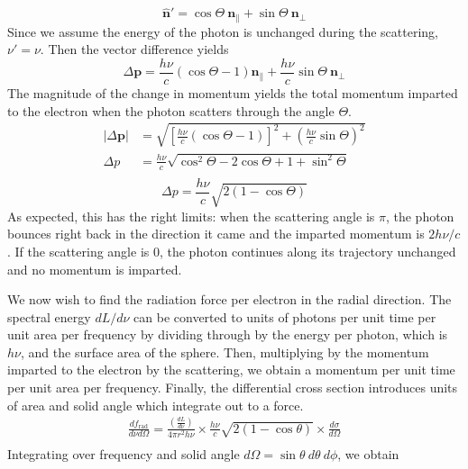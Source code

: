 \documentclass{article}
\begin{document}
%
\begin{equation}
    \mathbf{\hat n'} = \cos \Theta \ \mathbf{n_\parallel} + \sin \Theta\  \mathbf{n_\perp}
\end{equation}
%
Since we assume the energy of the photon is unchanged during the scattering, $\nu' = \nu$. Then the vector difference yields
%
\begin{equation}
    \Delta \mathbf{p} = \frac{h\nu}{c}\left(\cos \Theta - 1\right) \mathbf{n_\parallel} + \frac{h\nu}{c}\sin \Theta \ \mathbf{n_\perp}
\end{equation}
%
The magnitude of the change in momentum yields the total momentum imparted to the electron when the photon scatters through the angle $\Theta$. 
%
\begin{equation*}
\begin{split}
    |\Delta \mathbf{p}| &= \sqrt{\left[\frac{h\nu}{c}\left(\cos \Theta - 1\right)\right]^2 + \left(\frac{h\nu}{c}\sin \Theta\right)^2}\\
    \Delta p &= \frac{h\nu}{c}\sqrt{\cos ^2 \Theta - 2 \cos \Theta + 1 + \sin ^2\Theta}\\
    \end{split}
\end{equation*}
%
\begin{equation} \label{momentum_per_photon}
    \boxed{\Delta p = \frac{h\nu}{c}\sqrt{2\left(1 - \cos \Theta \right)}}
\end{equation}
%
As expected, this has the right limits: when the scattering angle is $\pi$, the photon bounces right back in the direction it came and the imparted momentum is $2h\nu/c$. If the scattering angle is $0$, the photon continues along its trajectory unchanged and no momentum is imparted. 

We now wish to find the radiation force per electron in the radial direction. The spectral energy $dL/d\nu$ can be converted to units of photons per unit time per unit area per frequency by dividing through by the energy per photon, which is $h\nu$, and the surface area of the sphere. Then, multiplying by the momentum imparted to the electron by the scattering, we obtain a momentum per unit time per unit area per frequency. Finally, the differential cross section introduces units of area and solid angle which integrate out to a force.
%
\begin{equation}
    \begin{split}
    \frac{df_{\mathrm{rad}}}{d\nu d\Omega} = \frac{\left(\frac{dL}{d\nu}\right)}{4\pi r^2 h\nu}\times \frac{h\nu}{c}\sqrt{2\left(1 - \cos \theta \right)} \times \frac{d\sigma}{d\Omega} \\
    \end{split}
\end{equation}
%
Integrating over frequency and solid angle $d\Omega = \sin \theta \ d\theta\ d\phi$, we obtain
\end{document}
